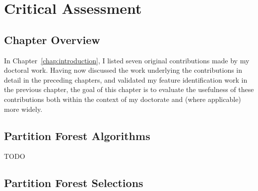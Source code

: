\chapter{Critical Assessment}
\label{chap:assessment}

\section{Chapter Overview}

In Chapter~\ref{chap:introduction}, I listed seven original contributions made by my doctoral work. Having now discussed the work underlying the contributions in detail in the preceding chapters, and validated my feature identification work in the previous chapter, the goal of this chapter is to evaluate the usefulness of these contributions both within the context of my doctorate and (where applicable) more widely.

\section{Partition Forest Algorithms}

TODO

\iffalse
+ Useful both for imaging and hierarchical pathfinding
+ Algorithms carefully pinned down, well-justified, reasonable complexities
+ Parent switching algorithm improves on previous state-of-the-art (Nacken) because it makes extra reasonable parent switches possible
+ Unzipping, zipping, non-sibling node merging have no obvious comparisons in the literature
\fi

\section{Partition Forest Selections}


